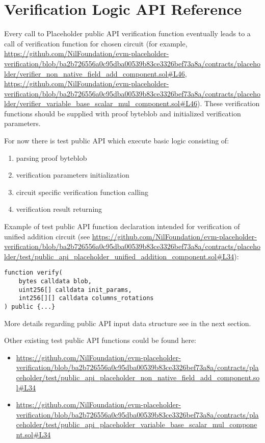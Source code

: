 \section{Verification Logic API Reference}

Every call to Placeholder public API verification function eventually leads to a call of verification function for chosen circuit
    (for example, \url{https://github.com/NilFoundation/evm-placeholder-verification/blob/ba2b726556a0c95dba00539b83ce3326bef73a8a/contracts/placeholder/verifier_non_native_field_add_component.sol#L46},
    \url{https://github.com/NilFoundation/evm-placeholder-verification/blob/ba2b726556a0c95dba00539b83ce3326bef73a8a/contracts/placeholder/verifier_variable_base_scalar_mul_component.sol#L46}). 
These verification functions should be supplied with proof byteblob and initialized verification parameters.

For now there is test public API which execute basic logic consisting of:
\begin{enumerate}
    \item parsing proof byteblob
    \item verification parameters initialization
    \item circuit specific verification function calling
    \item verification result returning
\end{enumerate}

Example of test public API function declaration intended for verification of unified addition circuit
 (see \url{https://github.com/NilFoundation/evm-placeholder-verification/blob/ba2b726556a0c95dba00539b83ce3326bef73a8a/contracts/placeholder/test/public_api_placeholder_unified_addition_component.sol#L34}):

\begin{verbatim}
function verify(
    bytes calldata blob,
    uint256[] calldata init_params,
    int256[][] calldata columns_rotations
) public {...}
\end{verbatim}

More details regarding public API input data structure see in the next section.

Other existing test public API functions could be found here:
\begin{itemize}
    \item \url{https://github.com/NilFoundation/evm-placeholder-verification/blob/ba2b726556a0c95dba00539b83ce3326bef73a8a/contracts/placeholder/test/public_api_placeholder_non_native_field_add_component.sol#L34}
    \item \url{https://github.com/NilFoundation/evm-placeholder-verification/blob/ba2b726556a0c95dba00539b83ce3326bef73a8a/contracts/placeholder/test/public_api_placeholder_variable_base_scalar_mul_component.sol#L34}
\end{itemize}
